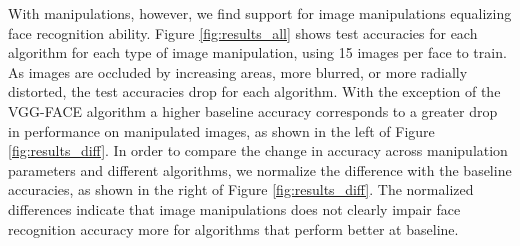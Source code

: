 \documentclass[pageno]{cos429}
\begin{document}
With manipulations, however, we find support for image manipulations equalizing face recognition ability. Figure \ref{fig:results_all} shows test accuracies for each algorithm for each type of image manipulation, using 15 images per face to train. As images are occluded by increasing areas, more blurred, or more radially distorted, the test accuracies drop for each algorithm. With the exception of the VGG-FACE algorithm a higher baseline accuracy corresponds to a greater drop in performance on manipulated images, as shown in the left of Figure \ref{fig:results_diff}. In order to compare the change in accuracy across manipulation parameters and different algorithms, we normalize the difference with the baseline accuracies, as shown in the right of Figure \ref{fig:results_diff}. The normalized differences indicate that image manipulations does not clearly impair face recognition accuracy more for algorithms that perform better at baseline.
\end{document}
